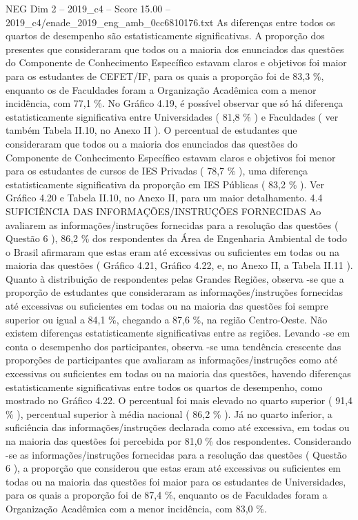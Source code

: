 \begin{textsample}{NEG Dim 2 – 2019\_c4 – Score 15.00 – 2019\_c4/enade\_2019\_eng\_amb\_0cc6810176.txt}
As diferenças entre todos os quartos de desempenho são estatisticamente significativas.
A proporção dos presentes que consideraram que todos ou a maioria dos enunciados das questões do Componente de Conhecimento Específico estavam claros e objetivos foi maior para os estudantes de CEFET/IF, para os quais a proporção foi de 83,3 \%, enquanto os de Faculdades foram a Organização Acadêmica com a menor incidência, com 77,1 \%.
No Gráfico 4.19, é possível observar que só há diferença estatisticamente significativa entre Universidades ( 81,8 \% ) e Faculdades ( ver também Tabela II.10, no Anexo II ).
O percentual de estudantes que consideraram que todos ou a maioria dos enunciados das questões do Componente de Conhecimento Específico estavam claros e objetivos foi menor para os estudantes de cursos de IES Privadas ( 78,7 \% ), uma diferença estatisticamente significativa da proporção em IES Públicas ( 83,2 \% ).
Ver Gráfico 4.20 e Tabela II.10, no Anexo II, para um maior detalhamento. 4.4 SUFICIÊNCIA DAS INFORMAÇÕES/INSTRUÇÕES FORNECIDAS Ao avaliarem as informações/instruções fornecidas para a resolução das questões ( Questão 6 ), 86,2 \% dos respondentes da Área de Engenharia Ambiental de todo o Brasil afirmaram que estas eram até excessivas ou suficientes em todas ou na maioria das questões ( Gráfico 4.21, Gráfico 4.22, e, no Anexo II, a Tabela II.11 ).
Quanto à distribuição de respondentes pelas Grandes Regiões, observa -se que a proporção de estudantes que consideraram as informações/instruções fornecidas até excessivas ou suficientes em todas ou na maioria das questões foi sempre superior ou igual a 84,1 \%, chegando a 87,6 \%, na região Centro-Oeste.
Não existem diferenças estatisticamente significativas entre as regiões.
Levando -se em conta o desempenho dos participantes, observa -se uma tendência crescente das proporções de participantes que avaliaram as informações/instruções como até excessivas ou suficientes em todas ou na maioria das questões, havendo diferenças estatisticamente significativas entre todos os quartos de desempenho, como mostrado no Gráfico 4.22.
O percentual foi mais elevado no quarto superior ( 91,4 \% ), percentual superior à média nacional ( 86,2 \% ).
Já no quarto inferior, a suficiência das informações/instruções declarada como até excessiva, em todas ou na maioria das questões foi percebida por 81,0 \% dos respondentes.
Considerando -se as informações/instruções fornecidas para a resolução das questões ( Questão 6 ), a proporção que considerou que estas eram até excessivas ou suficientes em todas ou na maioria das questões foi maior para os estudantes de Universidades, para os quais a proporção foi de 87,4 \%, enquanto os de Faculdades foram a Organização Acadêmica com a menor incidência, com 83,0 \%.

\end{textsample}
